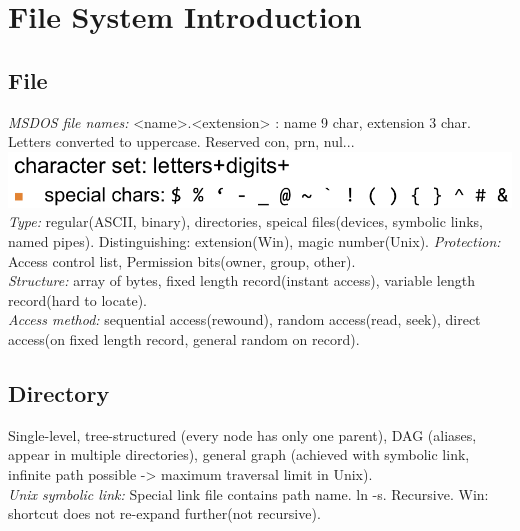 \section{File System Introduction}
\subsection*{File}
\emph{MSDOS file names:} <name>.<extension> : name 9 char, extension 3 char. Letters converted to uppercase. Reserved con, prn, nul...\\
\includegraphics[width=0.75\linewidth]{images/char-set-msdos}\\
\emph{Type:} regular(ASCII, binary), directories, speical files(devices, symbolic links, named pipes). Distinguishing: extension(Win), magic number(Unix).
\emph{Protection:} Access control list, Permission bits(owner, group, other).\\
\emph{Structure:} array of bytes, fixed length record(instant access), variable length record(hard to locate).\\
\emph{Access method:} sequential access(rewound), random access(read, seek), direct access(on fixed length record, general random on record).

\subsection*{Directory}
Single-level, tree-structured (every node has only one parent), DAG (aliases, appear in multiple directories), general graph (achieved with symbolic link, infinite path possible -> maximum traversal limit in Unix).\\
\emph{Unix symbolic link:} Special link file contains path name. ln -s. Recursive. Win: shortcut does not re-expand further(not recursive).